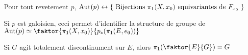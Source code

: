 \documentclass[../main.tex]{subfiles}
\begin{document}
\begin{lemma}
Pour tout revetement $p$, $\operatorname{Aut}( p) \leftrightarrow \left\{ \text{ Bijections } \pi_1( X,x_0) \text{ equivariantes de $F_{x_0} $ }  \right\} $ 
\end{lemma}
Si $p$ est galoisien, ceci permet d'identifier la structure de groupe de $\aut( p) \simeq \faktor{\pi_1( X,x_0) }{ p_\ast ( \pi_1( E,e_0) ) }$	 
\begin{crly}
Si $G$ agit totalement discontinument sur $E$, alors $ \pi_1 (  \faktor{E}{G})= G $ 
\end{crly}

	
\end{document}
